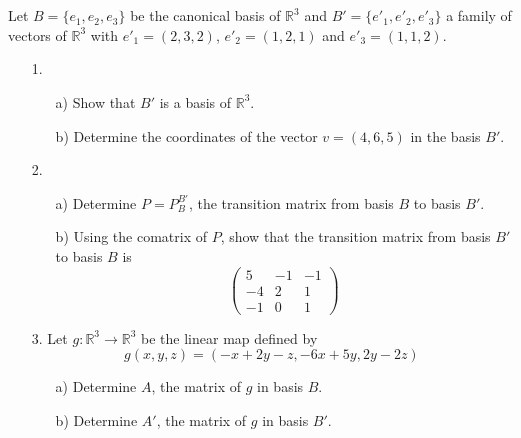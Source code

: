 \documentclass[12pt]{article}
\begin{document}
\begin{answerbox}
\end{answerbox}

\newpage  
\section{}
Let $B = \{e_1, e_2, e_3\}$ be the canonical basis of $\mathbb{R}^3$ and $B' = \{e'_1, e'_2, e'_3\}$ a family of vectors of $\mathbb{R}^3$ with
$e'_1 = (2,3,2)$, $e'_2 = (1,2,1)$ and $e'_3 = (1,1,2)$.

\begin{enumerate}
\item[1.] 
   \begin{enumerate}
   \item[a)] Show that $B'$ is a basis of $\mathbb{R}^3$.
   \item[b)] Determine the coordinates of the vector $v = (4,6,5)$ in the basis $B'$.
   \end{enumerate}

\item[2.] 
   \begin{enumerate}
   \item[a)] Determine $P = P^{B'}_B$, the transition matrix from basis $B$ to basis $B'$.
   \item[b)] Using the comatrix of $P$, show that the transition matrix from basis $B'$ to basis $B$ is
   \[
   \begin{pmatrix}
   5 & -1 & -1 \\
   -4 & 2 & 1 \\
   -1 & 0 & 1
   \end{pmatrix}
   \]
   \end{enumerate}

\item[3.] Let $g: \mathbb{R}^3 \rightarrow \mathbb{R}^3$ be the linear map defined by
\begin{equation*}
g(x,y,z) = (-x + 2y - z, -6x + 5y, 2y - 2z)
\end{equation*}
   \begin{enumerate}
   \item[a)] Determine $A$, the matrix of $g$ in basis $B$.
   \item[b)] Determine $A'$, the matrix of $g$ in basis $B'$.
   \end{enumerate}
\end{enumerate}

\begin{answerbox}
\end{answerbox}

\end{document}
